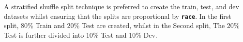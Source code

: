 A stratified shuffle split technique is preferred to create the train, test, and dev datasets whilst ensuring that the splits are proportional by \textbf{\texttt{race}}. In the first split, 80\% Train and 20\% Test are created, whilst in the Second split, The 20\% Test is further divided into 10\% Test and 10\% Dev.



	

	


	
	
	
	
	
	
	
	

	
	



